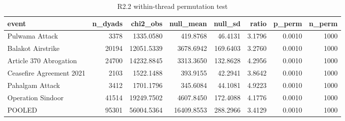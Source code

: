\begin{table}
\caption{R2.2 within-thread permutation test}
\label{tab:r1r2_transition_permutation}
\begin{tabular}{lrrrrrrr}
\toprule
event & n\_dyads & chi2\_obs & null\_mean & null\_sd & ratio & p\_perm & n\_perm \\
\midrule
Pulwama Attack & 3378 & 1335.0580 & 419.8768 & 46.4131 & 3.1796 & 0.0010 & 1000 \\
Balakot Airstrike & 20194 & 12051.5339 & 3678.6942 & 169.6403 & 3.2760 & 0.0010 & 1000 \\
Article 370 Abrogation & 24700 & 14232.8845 & 3313.3650 & 132.8628 & 4.2956 & 0.0010 & 1000 \\
Ceasefire Agreement 2021 & 2103 & 1522.1488 & 393.9155 & 42.2941 & 3.8642 & 0.0010 & 1000 \\
Pahalgam Attack & 3412 & 1701.1796 & 345.6084 & 44.1081 & 4.9223 & 0.0010 & 1000 \\
Operation Sindoor & 41514 & 19249.7502 & 4607.8450 & 172.4088 & 4.1776 & 0.0010 & 1000 \\
POOLED & 95301 & 56004.5364 & 16409.8553 & 288.2966 & 3.4129 & 0.0010 & 1000 \\
\bottomrule
\end{tabular}
\end{table}
